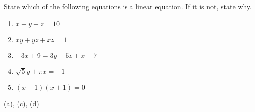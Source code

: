 {State which of the following equations is a linear equation. If it is not, state why.
\begin{enumerate}
\item		$x+y+z = 10$
\item		$xy + yz+ xz = 1$
\item		$-3x + 9 = 3y - 5z+ x-7$
\item		$\sqrt{5}y + \pi x =-1$
\item		$(x-1)(x+1) = 0$
\end{enumerate}
}
{(a), (c), (d)}